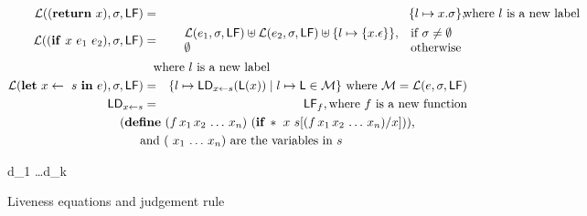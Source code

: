 \begin{figure}[t]
\begin{eqnarray*}
\mathcal{L}((\RETURN~x),\sigma,\Lfonly) &=& \{l \mapsto x.\sigma\}, \makebox[0mm]{\hspace*{3cm} where $l$ is a new label} \\
\mathcal{L}((\SIF~x~e_1~e_2),\sigma,\Lfonly) &=&
        \begin{array}{l l}
                    \mathcal{L}(e_1,\sigma,\Lfonly) \uplus
        \mathcal{L}(e_2,\sigma,\Lfonly) \uplus
        \{l \mapsto  \{x.\epsilon\}\},  & \mbox{if}~\sigma \ne \emptyset\\
        \emptyset  & \mbox{otherwise}
                 \end{array} \\
 \makebox[0mm]{\hspace*{3.8cm} where $l$ is a new label}\\
\mathcal{L}(\LET~x \leftarrow~s~\IN~e),\sigma,\Lfonly) &=&
        \{ l \mapsto \Ldonly_{x \leftarrow s}(\Lv(x)) \mid l \mapsto \Lv
        \in \mathcal{M}\}
\mbox{ where } \mathcal{M} = \mathcal{L}(e,\sigma,\Lfonly)\\
\Ldonly_{x \leftarrow s} &=& \Lfonly_f, \mbox{where}~f~\mbox{is a new function}\\
 \makebox[0mm]{\hspace*{7cm}   
 $(\DEFINE~(f\,x_1\,x_2\, \ldots \, x_n)~(\SIF\,*~x~s[(f\,x_1\,
           x_2\, \ldots\, x_n)/x]))$,} \\
 \makebox[0mm]{\hspace*{5.5cm} and 
     $(\ x_1\, \ldots\, x_n)$ are the variables in $s$}
\end{eqnarray*}

\begin{minipage}{0.85\textwidth}
        { d_1 \ldots d_k \len \Lfonly
\\ }
\end{minipage}

\bigskip
\begin{center}
\begin{minipage}{0.85\textwidth}
\end{minipage}
\end{center}
\normalsize
  \caption{Liveness equations and judgement rule}\label{fig:live-judge}
\end{figure}
